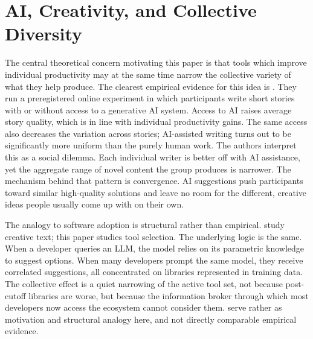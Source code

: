 \documentclass[12pt, a4paper]{report}
\begin{document}
\section{AI, Creativity, and Collective Diversity}\label{sec:lit-creativity}

The central theoretical concern motivating this paper is that tools which improve individual productivity may at the same time narrow the collective variety of what they help produce. The clearest empirical evidence for this idea is \citet{doshi2024generative}. They run a preregistered online experiment in which participants write short stories with or without access to a generative AI system. Access to AI raises average story quality, which is in line with individual productivity gains. The same access also decreases the variation across stories; AI-assisted writing turns out to be significantly more uniform than the purely human work. The authors interpret this as a social dilemma. Each individual writer is better off with AI assistance, yet the aggregate range of novel content the group produces is narrower. The mechanism behind that pattern is convergence. AI suggestions push participants toward similar high-quality solutions and leave no room for the different, creative ideas people usually come up with on their own.

The analogy to software adoption is structural rather than empirical. \citet{doshi2024generative} study creative text; this paper studies tool selection. The underlying logic is the same. When a developer queries an LLM, the model relies on its parametric knowledge to suggest options. When many developers prompt the same model, they receive correlated suggestions, all concentrated on libraries represented in training data. The collective effect is a quiet narrowing of the active tool set, not because post-cutoff libraries are worse, but because the information broker through which most developers now access the ecosystem cannot consider them. \citet{doshi2024generative} serve rather as motivation and structural analogy here, and not directly comparable empirical evidence.
\end{document}
